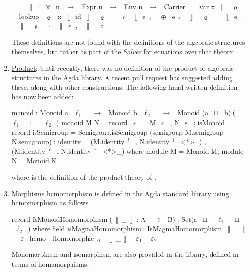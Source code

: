 \begin{enumerate}
\begin{agdacode}
~$\llbracket$~_~$\rrbracket$~ : ~$\forall$~ {n} ~$\to$~ Expr n ~$\to$~ Env n ~$\to$~ Carrier 
~$\llbracket$~ var x ~$\rrbracket$~ ~$\upvarrho$~ = lookup ~$\upvarrho$~ x 
~$\llbracket$~ id ~$\rrbracket$~ ~$\upvarrho$~ = ~$\epsilon$~ 
~$\llbracket$~ e~$_1$~ ~$\oplus$~ e~$_2$~ ~$\rrbracket$~ ~$\upvarrho$~ = ~$\llbracket$~ e~$_1$~ ~$\rrbracket$~ ~$\upvarrho$~ ~$\cdot$~ ~$\llbracket$~ e~$_2$~ ~$\rrbracket$~ ~$\upvarrho$~ 
\end{agdacode}

These definitions are not found with the definitions of the
algebraic structures themselves, but rather as part of the
\emph{Solver} for equations over that theory.

\item \href{https://github.com/agda/agda-stdlib/blob/5365791e21af9abb324aa3721571bdceee919932/src/Algebra/Construct/DirectProduct.agda}{Product}:
Until recently, there was no definition of the product of algebraic
structures in the Agda library.  A 
\href{https://github.com/agda/agda-stdlib/pull/1109}{recent pull request}
has suggested adding these, along with other constructions.  The
following hand-written definition has now been added:
\begin{agdacode}
monoid : Monoid a ~$\ell_1$~ ~$\to$~ Monoid b ~$\ell_2$~ ~$\to$~ Monoid (a ~$\sqcup$~ b) (~$\ell_1$~ ~$\sqcup$~ ~$\ell_2$~)
monoid M N = record
  { ~$\varepsilon$~ = M.~$\varepsilon$~ , N.~$\varepsilon$~
  ; isMonoid = record 
     { isSemigroup = Semigroup.isSemigroup 
                     (semigroup M.semigroup N.semigroup)
     ; identity = (M.identity~$^{l}$~ , N.identity~$^{l}$~ <*>_)
                  , (M.identity~$^{r}$~ , N.identity~$^{r}$~ <*>_)
     }
  } where module M = Monoid M; module N = Monoid N 
\end{agdacode}
where  is the definition of the product theory of . 

\item \href{https://github.com/agda/agda-stdlib/blob/e34a31f80b215812ab26c10f84c9a658eeda3110/src/Algebra/Morphism/Structures.agda}{Morphisms}
 homomorphism is defined in the Agda standard library using  homomorphism as follows: 
\begin{togcode} 
record IsMonoidHomomorphism (~$\llbracket$~_~$\rrbracket$~: A ~$\to$~ B) : Set(a ~$\sqcup$~ ~$\ell_1$~ ~$\sqcup$~ ~$\ell_2$~) where 
 field
   isMagmaHomomorphism : IsMagmaHomomorphism ~$\llbracket$~_~$\rrbracket$~
   ~$\varepsilon$~-homo   : Homomorphic~$_0$~ ~$\llbracket$~_~$\rrbracket$~ ~$\varepsilon_1$~ ~$\varepsilon_2$~
\end{togcode} 

Monomorphism and isomorphism are also provided in the library, defined in terms of homomorphisms. 
\end{enumerate}
